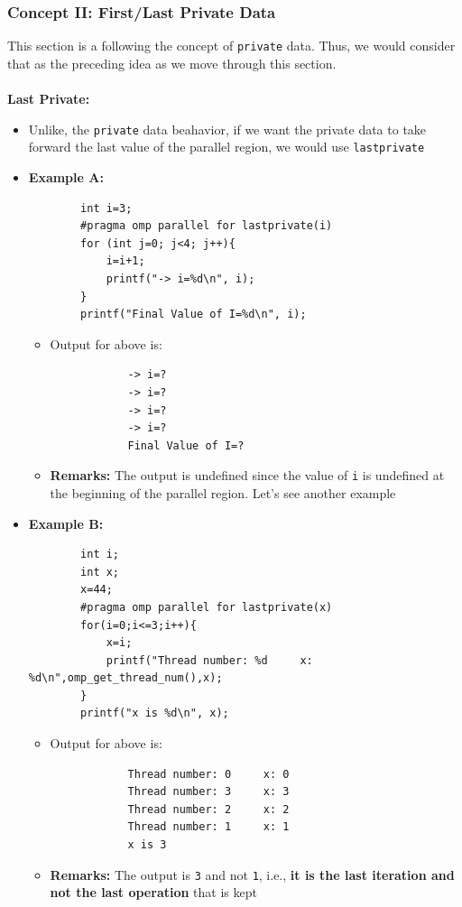 \documentclass[12pt, a4paper]{report}
\begin{document}
\subsubsection{Concept II: First/Last Private Data}
This section is a following the concept of \verb$private$ data. Thus, we would consider that as the preceding idea as we move through this 
section.\\
\\
{\bfseries{Last Private:}}
\begin{itemize}
    \item Unlike, the \verb$private$ data beahavior, if we want the private data to take forward the last value of the parallel region, we would
          use \verb$lastprivate$
    \item {\bfseries{Example A:}}
    \begin{verbatim}
        int i=3;
        #pragma omp parallel for lastprivate(i)
        for (int j=0; j<4; j++){ 
            i=i+1;
            printf("-> i=%d\n", i); 
        }
        printf("Final Value of I=%d\n", i);
    \end{verbatim}
    \begin{itemize}
        \item Output for above is:
        \begin{verbatim}
            -> i=?
            -> i=?
            -> i=?
            -> i=?
            Final Value of I=?
        \end{verbatim}
        \item {\bfseries{Remarks:}} The output is undefined since the value of \verb$i$ is undefined at the beginning of the parallel region. 
              Let's see another example
    \end{itemize}
    \item {\bfseries{Example B:}}
    \begin{verbatim}
        int i;
        int x;
        x=44;
        #pragma omp parallel for lastprivate(x)
        for(i=0;i<=3;i++){
            x=i;
            printf("Thread number: %d     x: %d\n",omp_get_thread_num(),x);
        }
        printf("x is %d\n", x);
    \end{verbatim}
    \begin{itemize}
        \item Output for above is:
        \begin{verbatim}
            Thread number: 0     x: 0
            Thread number: 3     x: 3
            Thread number: 2     x: 2
            Thread number: 1     x: 1
            x is 3
        \end{verbatim}
        \item {\bfseries{Remarks:}} The output is \verb$3$ and not \verb$1$, i.e., {\bfseries{it is the last iteration and not the last operation}}
              that is kept
    \end{itemize}
\end{itemize}
\end{document}
